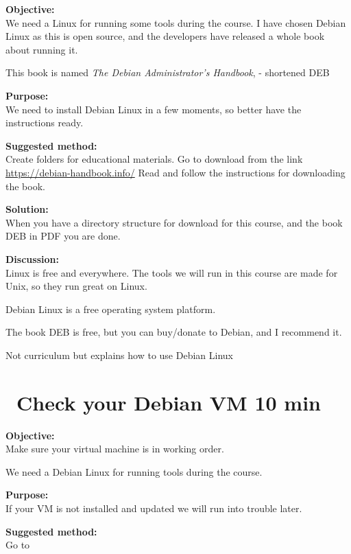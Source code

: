 \documentclass[a4paper,11pt,notitlepage]{report}
\begin{document}


{\bf Objective:}\\
We need a Linux for running some tools during the course. I have chosen Debian Linux as this is open source, and the developers have released a whole book about running it.

This book is named
\emph{The Debian Administrator’s Handbook},  - shortened DEB

{\bf Purpose:}\\
We need to install Debian Linux in a few moments, so better have the instructions ready.

{\bf Suggested method:}\\
Create folders for educational materials. Go to download from the link \url{https://debian-handbook.info/}
Read and follow the instructions for downloading the book.

{\bf Solution:}\\
When you have a directory structure for download for this course, and the book DEB in PDF you are done.

{\bf Discussion:}\\
Linux is free and everywhere. The tools we will run in this course are made for Unix, so they run great on Linux.

Debian Linux is a free operating system platform.

The book DEB is free, but you can buy/donate to Debian, and I recommend it.

Not curriculum but explains how to use Debian Linux


\chapter{\faInfoCircle\ Check your Debian VM 10 min}
\label{ex:sw-basicDebianVM}


{\bf Objective:}\\
Make sure your virtual machine is in working order.

We need a Debian Linux for running tools during the course.

{\bf Purpose:}\\
If your VM is not installed and updated we will run into trouble later.

{\bf Suggested method:}\\
Go to 
\end{document}
